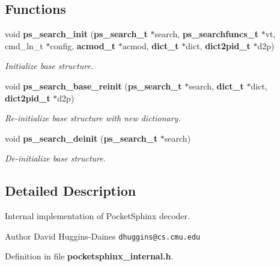\subsection*{Functions}
\begin{DoxyCompactItemize}
\item 
void {\bf ps\-\_\-search\-\_\-init} ({\bf ps\-\_\-search\-\_\-t} $\ast$search, {\bf ps\-\_\-searchfuncs\-\_\-t} $\ast$vt, cmd\-\_\-ln\-\_\-t $\ast$config, {\bf acmod\-\_\-t} $\ast$acmod, {\bf dict\-\_\-t} $\ast$dict, {\bf dict2pid\-\_\-t} $\ast$d2p)\label{pocketsphinx__internal_8h_ad848d8d0cf0398542bfb74a2e34dbff3}

\begin{DoxyCompactList}\small\item\em Initialize base structure. \end{DoxyCompactList}\item 
void {\bf ps\-\_\-search\-\_\-base\-\_\-reinit} ({\bf ps\-\_\-search\-\_\-t} $\ast$search, {\bf dict\-\_\-t} $\ast$dict, {\bf dict2pid\-\_\-t} $\ast$d2p)\label{pocketsphinx__internal_8h_a307801961f27bd5f4b82a3e6b83e0ca1}

\begin{DoxyCompactList}\small\item\em Re-\/initialize base structure with new dictionary. \end{DoxyCompactList}\item 
void {\bf ps\-\_\-search\-\_\-deinit} ({\bf ps\-\_\-search\-\_\-t} $\ast$search)\label{pocketsphinx__internal_8h_a1299496b3498166928702d0701934e50}

\begin{DoxyCompactList}\small\item\em De-\/initialize base structure. \end{DoxyCompactList}\end{DoxyCompactItemize}


\subsection{Detailed Description}
Internal implementation of Pocket\-Sphinx decoder. \begin{DoxyAuthor}{Author}
David Huggins-\/\-Daines {\tt dhuggins@cs.\-cmu.\-edu} 
\end{DoxyAuthor}


Definition in file {\bf pocketsphinx\-\_\-internal.\-h}.

